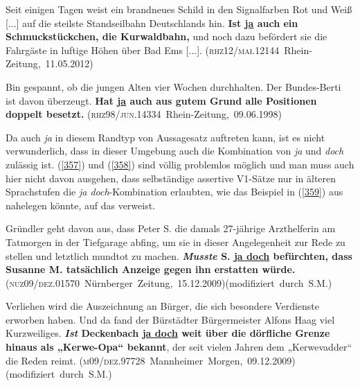 \begin{exe}
	\ex\label{355} 

	Seit einigen Tagen weist ein brandneues Schild in den Signalfarben Rot und Weiß [...] auf die steilste Standseilbahn Deutschlands hin. \textbf{Ist 			\underline{ja} auch ein Schmuckstückchen, die Kurwaldbahn,} und noch dazu befördert sie die Fahrgäste in luftige Höhen über Bad Ems [...].
	\newline
	\hbox{}\hfill\hbox{(\textsc{rhz12/mai.12144} Rhein-Zeitung, 11.05.2012)}	
\end{exe}

\begin{exe}
	\ex\label{356} 

	Bin gespannt, ob die jungen Alten vier Wochen durchhalten. Der Bundes-Berti ist davon überzeugt. \textbf{Hat \underline{ja} auch aus gutem Grund alle Positionen 		doppelt besetzt. }
	\hbox{}\hfill\hbox{(\textsc{rhz98/jun.14334} Rhein-Zeitung, 09.06.1998)}	
\end{exe}					                                   
Da auch \textit{ja} in diesem Randtyp von Aussagesatz auftreten kann, ist es nicht verwunderlich, dass in dieser Umgebung auch die Kombination von \textit{ja} und \textit{doch} zulässig ist. (\ref{357}) und (\ref{358}) sind völlig problemlos möglich und man muss auch hier nicht davon ausgehen, dass selbständige assertive V1-Sätze nur in älteren Sprachstufen die \textit{ja doch}-Kombination erlaubten, wie das Beispiel in (\ref{359}) aus \citet{Oppenrieder1987} nahelegen könnte, auf das \citet[158, Fn 186]{Oennerfors1997} verweist.
 
\begin{exe}
	\ex\label{357} 
	Gründler geht davon aus, dass Peter S. die damals 27-jährige Arzthelferin am Tatmorgen in der Tiefgarage abfing, um sie in dieser Angelegenheit zur Rede zu stellen und letztlich mundtot zu machen. \textbf{\textit{Musste} S. \underline{ja doch} befürchten, dass Susanne M. tatsächlich Anzeige gegen ihn erstatten würde.}
	\hbox{}\hfill\hbox{(\textsc{nuz09/dez.01570} Nürnberger Zeitung, 15.12.2009)}\newline \hbox{}\hfill\hbox{(modifiziert durch S.M.)}	
\end{exe} 		
 		
\begin{exe}
	\ex\label{358} 

	Verliehen wird die Auszeichnung an Bürger, die sich besondere Verdienste erworben haben. Und da fand der Bürstädter Bürgermeister Alfons Haag viel 			Kurzweiliges. \textbf{\textit{Ist} Deckenbach \underline{ja doch} weit über die dörfliche Grenze hinaus als „Kerwe-Opa“ bekannt}, der seit 		vielen Jahren dem „Kerwevadder“ die Reden reimt.		   
	\hbox{}\hfill\hbox{(\textsc{m09/dez.97728} Mannheimer Morgen, 09.12.2009)}\newline\hbox{}\hfill\hbox{(modifiziert durch S.M.)}
\end{exe} 	
							                               	
